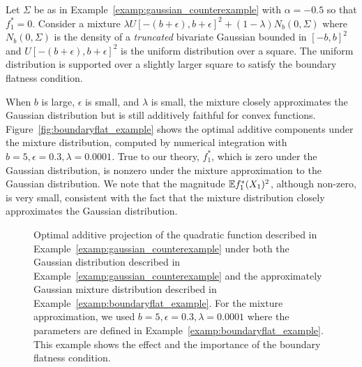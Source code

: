 \begin{example} 
\label{examp:boundaryflat_example}
Let $\Sigma$ be as in Example~\ref{examp:gaussian_counterexample} with
$\alpha = -0.5$ so that $f^*_1 = 0$. Consider a mixture $\lambda
U[-(b+\epsilon), b+\epsilon]^2 + (1-\lambda) N_b(0, \Sigma)$ where
$N_b(0,\Sigma)$ is the density of a \emph{truncated} bivariate
Gaussian bounded in $[-b, b]^2$ and $U[-(b+\epsilon), b+\epsilon]^2$
is the uniform distribution over a square. The uniform distribution is
supported over a slightly larger square to satisfy the boundary
flatness condition.

When $b$ is large, $\epsilon$ is small, and $\lambda$ is small, the
mixture closely approximates the Gaussian distribution but is still
additively faithful for convex
functions. Figure~\ref{fig:boundaryflat_example} shows the optimal
additive components under the mixture distribution, computed by
numerical integration with $b=5, \epsilon=0.3, \lambda=0.0001$. True
to our theory, $f^*_1$, which is zero under the Gaussian distribution,
is nonzero under the mixture approximation to the Gaussian
distribution. We note that the magnitude ${\mathbb E} f^*_1(X_1)^2$, although
non-zero, is very small, consistent with the fact that the mixture
distribution closely approximates the Gaussian distribution.
\end{example}


\begin{figure}[t]
\vskip-10pt
	\centering
\caption{Optimal additive projection of the quadratic function
  described in Example~\ref{examp:gaussian_counterexample} under both
  the Gaussian distribution described in
  Example~\ref{examp:gaussian_counterexample} and the
  approximately Gaussian mixture distribution described in
  Example~\ref{examp:boundaryflat_example}. For the mixture
  approximation, we used $b=5, \epsilon=0.3, \lambda=0.0001$ where the
  parameters are defined in
  Example~\ref{examp:boundaryflat_example}. This example shows the
  effect and the importance of the boundary flatness condition.}
\vskip-10pt
\end{figure}


